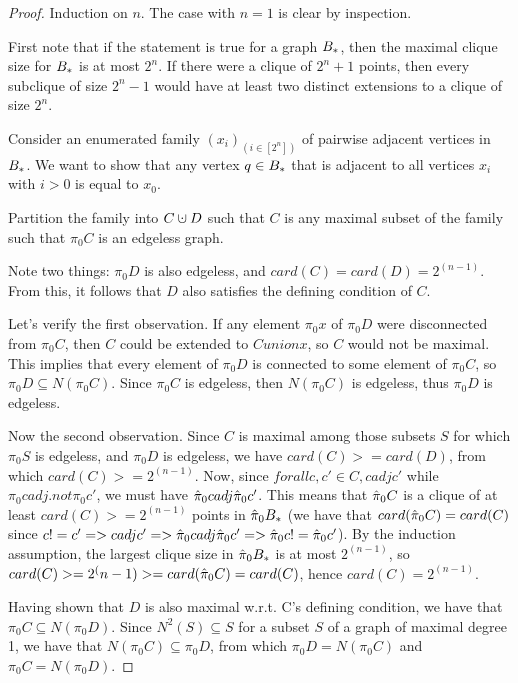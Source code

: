 \documentclass{amsart}
\theoremstyle{definition}
\newcommand{\cupdot}{\mathbin{\mathaccent\cdot\cup}}
\begin{document}
\begin{proof}
    Induction on $n$. The case with $n=1$ is clear by inspection.

    First note that if the statement is true for a graph $B_*$, then the maximal clique size for $B_*$ is at most $2^n$. If there were a clique of $2^n+1$ points, then every subclique of size $2^n - 1$ would have at least two distinct extensions to a clique of size $2^n$.
  
    Consider an enumerated family $(x_i)_(i \in [2^n])$ of pairwise adjacent
    vertices in $B_*$. We want to show that any vertex $q \in B_*$ that is
    adjacent to all vertices $x_i$ with $i > 0$ is equal to $x_0$.
  
    Partition the family into $C \cupdot D$ such that $C$ is any maximal
    subset of the family such that $\pi_0 C$ is an edgeless graph.
  
    Note two things: $\pi_0 D$ is also edgeless, and $card(C) = card(D) = 2^(n-1)$. From this, it follows that $D$ also satisfies the defining condition of $C$.
  
    Let's verify the first observation. If any element $\pi_0 x$ of $\pi_0 D$ were disconnected from $\pi_0 C$, then $C$ could be extended to $C union {x}$, so $C$ would not be maximal. This implies that every element of $\pi_0 D$ is connected to some element of $\pi_0 C$, so $\pi_0 D \subseteq N(\pi_0 C)$. Since $\pi_0 C$ is edgeless, then $N(\pi_0 C)$ is edgeless,
    thus $\pi_0 D$ is edgeless.
  
    Now the second observation. Since $C$ is maximal among those subsets $S$ for which $\pi_0 S$ is edgeless, and $\pi_0 D$ is edgeless, we have $card(C) >= card(D)$, from which $card(C) >= 2^(n-1)$. Now, since $forall c, c' \in C, c adj c'$ while $\pi_0 c adj.not \pi_0 c'$, we must have $\hat{\pi}_0 c adj \hat{\pi}_0 c'$. This means that $\hat{\pi}_0 C$ is a clique of at least $card(C) >= 2^(n-1)$ points in $\hat{\pi}_0 B_*$ (we have that $card(\hat{\pi}_0 C) = card(C)$ since $c != c' => c adj c' => \hat{\pi}_0 c adj \hat{\pi}_0 c' => \hat{\pi}_0 c != \hat{\pi}_0 c'$). By the induction assumption, the largest clique size in $\hat{\pi}_0 B_*$ is at most $2^(n-1)$, so $card(C) >= 2^(n-1) >= card(\hat{\pi}_0 C) = card(C)$, hence $card(C) = 2^(n-1)$.
  
    Having shown that $D$ is also maximal w.r.t. C's defining condition, we have that $\pi_0 C \subseteq N(\pi_0 D)$. Since $N^2(S) \subseteq S$ for a subset $S$ of a graph of maximal degree 1, we have that $N(\pi_0 C) \subseteq \pi_0 D$, from which $\pi_0 D = N(\pi_0 C)$ and $\pi_0 C = N(\pi_0 D)$.
  

\end{proof}
\end{document}
